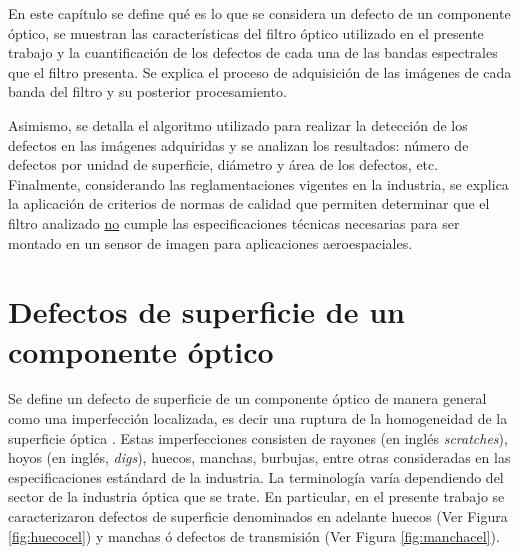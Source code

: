 

\singlespacing
{}

\hspace{0.5cm}En este capítulo se define qué es lo que se considera un defecto de un componente óptico, se muestran las características del filtro óptico utilizado en el presente trabajo y la cuantificación de los defectos de cada una de las bandas espectrales que el filtro presenta. Se explica el proceso de adquisición de las imágenes de cada banda del filtro y su posterior procesamiento. 

Asimismo, se detalla el algoritmo utilizado para realizar la detección de los defectos en las imágenes adquiridas y se analizan los resultados: número de defectos por unidad de superficie, diámetro y área de los defectos, etc. Finalmente, considerando las reglamentaciones vigentes en la industria, se explica la aplicación de criterios de normas de calidad que permiten determinar que el filtro analizado \underline{no} cumple las especificaciones técnicas necesarias para ser montado en un sensor de imagen para aplicaciones aeroespaciales.

\singlespacing
\section*{Defectos de superficie de un componente óptico}
\label{sec:defectsurf}

\vspace{1.0cm}
\vspace{1.0cm}

\hspace{0.5cm}Se define un defecto de superficie de un componente óptico de manera general como una imperfección localizada, es decir una ruptura de la homogeneidad de la superficie óptica \cite{Gomez_1998}. Estas imperfecciones consisten de rayones (en inglés \textit{scratches}), hoyos (en inglés, \textit{digs}), huecos, manchas, burbujas, entre otras consideradas en las especificaciones estándard de la industria. La terminología varía dependiendo del sector de la industria óptica que se trate. En particular, en el presente trabajo se caracterizaron defectos de superficie denominados en adelante huecos (Ver Figura \ref{fig:huecocel}) y manchas ó defectos de transmisión (Ver Figura \ref{fig:manchacel}). 

